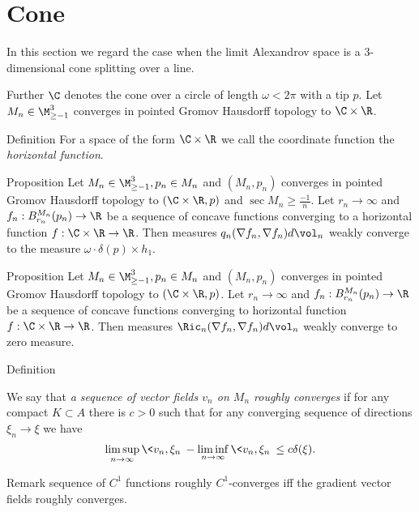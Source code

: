 
\section{Cone}

In this section we regard the case when the limit Alexandrov space
is a 3-dimensional cone splitting over a line.

Further $\C$ denotes the cone over a circle of length  $\omega<2\pi$
with a tip $p$.
Let $M_n\in\M_{\ge -1}^3$ converges in pointed
Gromov Hausdorff topology to $\C\times\R$.

\begin{thm}{Definition}
For a space of the form  $\C\times\R$
we call the
coordinate function   
the \emph{horizontal function}. 
\end{thm}

\begin{thm}{Proposition}
Let $M_n\in\M_{\ge -1}^3, p_n\in M_n$ and $(M_n,p_n)$ converges in pointed
Gromov Hausdorff topology to $(\C\times\R, p)$
and $\operatorname{sec}M_n\ge\frac{-1}{n}$.
Let $r_n\to\infty$ and $f_n:B_{r_n}^{M_n}(p_n)\to \R$ be a sequence of concave
functions 
converging to a horizontal function $f:\C\times\R\to\R$.
Then measures $q_n(\nabla f_n, \nabla f_n)d\vol_n$
weakly converge to the measure $\omega\cdot\delta(p)\times h_1$.

\end{thm}

\begin{thm}{Proposition}
Let $M_n\in\M_{\ge -1}^3, p_n\in M_n$ and $(M_n,p_n)$ converges in pointed
Gromov Hausdorff topology to $(\C\times\R, p)$.
Let $r_n\to\infty$ and $f_n:B_{r_n}^{M_n}(p_n)\to \R$ be a sequence of concave
functions 
converging to horizontal function $f:\C\times\R\to\R$.
Then measures $\Ric_n(\nabla f_n, \nabla f_n)d\vol_n$
weakly converge to zero measure.

\end{thm}



\begin{thm}{Definition}

We say that \emph {a sequence of vector fields $v_n$ on $M_n$ roughly converges }
if for any compact $K\subset A$ there is $c>0$ such that
for any converging sequence of directions $\xi_n\to\xi$
we have
$$\limsup_{n\to\infty} \<v_n,\xi_n\>-
 \liminf_{n\to\infty} \<v_n,\xi_n\>\le
 c\delta(\xi).
 $$
\end{thm}

\begin{thm}{Remark}
sequence of $C^1$ functions roughly $C^1$-converges
iff the gradient vector fields
roughly converges.

\end{thm}


